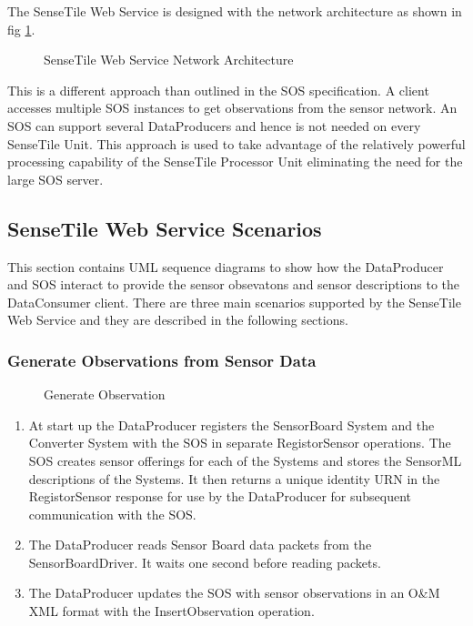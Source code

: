 \documentclass[]{final_report}
\begin{document}
The SenseTile Web Service is designed with the network architecture as shown in fig \ref{fig:Deployment_network}.
\begin{figure}[h]
\caption{SenseTile Web Service Network Architecture}\label{fig:Deployment_network}
\end{figure}
\newline
This is a different approach than outlined in the SOS specification. A client accesses multiple SOS instances to get observations from the sensor network. An SOS can support several DataProducers and hence is not needed on every SenseTile Unit. This approach is used to take advantage of the relatively powerful processing capability of the SenseTile Processor Unit eliminating the need for the large SOS server.

\subsection{SenseTile Web Service Scenarios}
This section contains UML sequence diagrams to show how the DataProducer and SOS interact to provide the sensor obsevatons and sensor descriptions to the DataConsumer client. There are three main scenarios supported by the SenseTile Web Service and they are described in the following sections.

\subsubsection{Generate Observations from Sensor Data}
\begin{figure}[h]
\centering
{}
\caption{Generate Observation}\label{fig:InsertObs}
\end{figure}
\newpage
 \begin{enumerate}
\item At start up the DataProducer registers the SensorBoard System and the Converter System with the SOS in separate RegistorSensor operations. The SOS creates sensor offerings for each of the Systems and stores the SensorML descriptions of the Systems. It then returns a unique identity URN in the RegistorSensor response for use by the DataProducer for subsequent communication with the SOS.
\item The DataProducer reads Sensor Board data packets from the SensorBoardDriver. It waits one second before reading packets.
\item The DataProducer updates the SOS with sensor observations in an O\&M XML format with the InsertObservation operation.
\end{enumerate}
\end{document}
